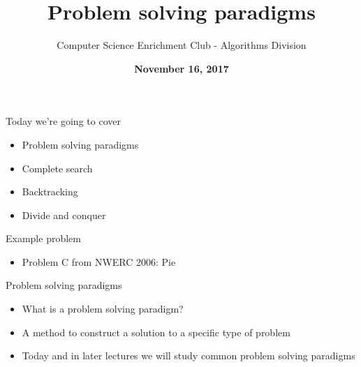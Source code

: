 \documentclass[10pt]{beamer}
\title{Problem solving paradigms}
\author{Computer Science Enrichment Club - Algorithms Division}
\date{\textbf{November 16, 2017}}
\newcommand{\bi}{\begin{itemize}}
\newcommand{\ei}{\end{itemize}}
\begin{document}
\maketitle


\begin{frame}{Today we're going to cover}
    \bi
        \item Problem solving paradigms
        \item Complete search
        \item Backtracking
        \item Divide and conquer
    \ei
\end{frame}

\begin{frame}{Example problem}
    \bi
        \item Problem C from NWERC 2006: Pie
    \ei
\end{frame}

\begin{frame}{Problem solving paradigms}
    \bi
        \item What is a problem solving paradigm?
        \item A method to construct a solution to a specific type of problem
        \item Today and in later lectures we will study common problem solving paradigms
    \ei
\end{frame}
\end{document}
